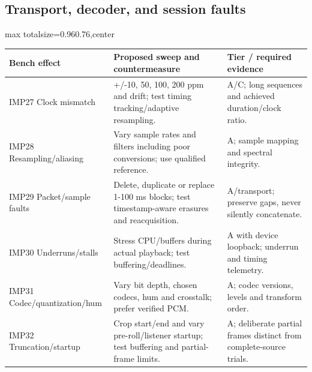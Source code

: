 \documentclass[11pt,a4paper]{article}
\newlength{\tableavail}
\renewcommand{\arraystretch}{1.13}
\begin{document}
\begin{landscape}\thispagestyle{plain}\centering
\subsection{Transport, decoder, and session faults}

\setlength{\tabcolsep}{5pt}\renewcommand{\arraystretch}{1.25}
\setlength{\tableavail}{\dimexpr\linewidth-4\tabcolsep\relax}
\begin{adjustbox}{max totalsize={0.96\linewidth}{0.76\textheight},center}
\begin{tabular}{@{}>{\raggedright\arraybackslash}p{0.23\tableavail}>{\raggedright\arraybackslash}p{0.54\tableavail}>{\raggedright\arraybackslash}p{0.23\tableavail}@{}}
\toprule
\textbf{Bench effect} & \textbf{Proposed sweep and countermeasure} & \textbf{Tier / required evidence}\\
\midrule
IMP27 Clock mismatch & +/-10, 50, 100, 200 ppm and drift; test timing tracking/adaptive resampling. & A/C; long sequences and achieved duration/clock ratio.\\[5pt]
IMP28 Resampling/aliasing & Vary sample rates and filters including poor conversions; use qualified reference. & A; sample mapping and spectral integrity.\\[5pt]
IMP29 Packet/sample faults & Delete, duplicate or replace 1-100 ms blocks; test timestamp-aware erasures and reacquisition. & A/transport; preserve gaps, never silently concatenate.\\[5pt]
IMP30 Underruns/stalls & Stress CPU/buffers during actual playback; test buffering/deadlines. & A with device loopback; underrun and timing telemetry.\\[5pt]
IMP31 Codec/quantization/hum & Vary bit depth, chosen codecs, hum and crosstalk; prefer verified PCM. & A; codec versions, levels and transform order.\\[5pt]
IMP32 Truncation/startup & Crop start/end and vary pre-roll/listener startup; test buffering and partial-frame limits. & A; deliberate partial frames distinct from complete-source trials.\\[5pt]
\bottomrule
\end{tabular}
\end{adjustbox}
\end{landscape}
\end{document}
